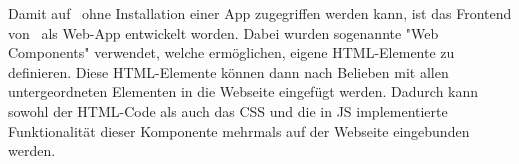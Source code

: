 \label{sec:webcomponents}

Damit auf \ZELIA\ ohne Installation einer App zugegriffen werden kann, ist das Frontend von \ZELIA\ als Web-App entwickelt worden. Dabei wurden sogenannte "Web Components" verwendet, welche ermöglichen, eigene HTML-Elemente zu definieren. Diese HTML-Elemente können dann nach Belieben mit allen untergeordneten Elementen in die Webseite eingefügt werden. Dadurch kann sowohl der HTML-Code als auch das CSS und die in JS implementierte Funktionalität dieser Komponente mehrmals auf der Webseite eingebunden werden.


\pagebreak
